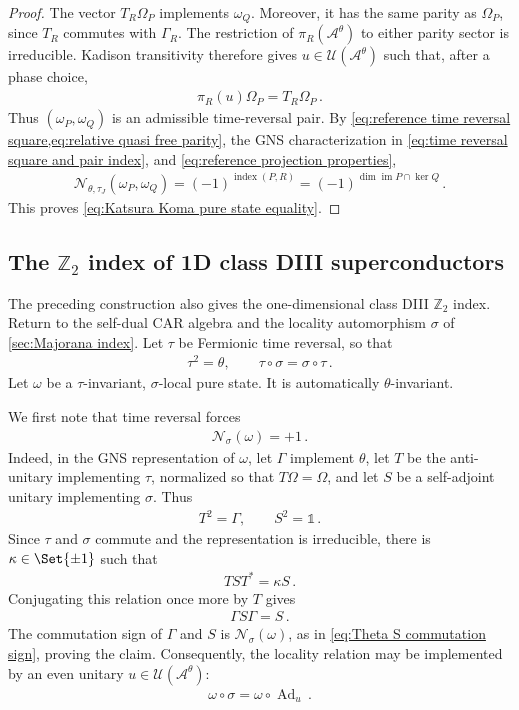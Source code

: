 \documentclass[a4paper,10pt]{article}
\numberwithin{equation}{section}
\theoremstyle{plain}
\theoremstyle{plain}
\theoremstyle{plain}
\theoremstyle{plain}
\theoremstyle{plain}
\theoremstyle{remark}
\theoremstyle{definition}
\newcommand{\ZZ}{\mathbb{Z}}
\newcommand{\calA}{\mathcal{A}}
\newcommand{\calN}{\mathcal{N}}
\newcommand{\calU}{\mathcal{U}}
\newcommand{\Ad}[1]{\operatorname{Ad}_{#1}}
\newcommand{\Id}{\mathds{1}}
\newcommand{\im}{\operatorname{im}}
\newcommand{\eq}[1]{\begin{align*}#1\end{align*}}
\newcommand{\br}[1]{\left(#1\right)}
\begin{document}
\begin{proof}
The vector $T_R\Omega_P$ implements $\omega_Q$. Moreover, it has the
same parity as $\Omega_P$, since $T_R$ commutes with $\Gamma_R$. The
restriction of $\pi_R(\calA^\theta)$ to either parity sector is
irreducible. Kadison transitivity therefore gives
$u\in\calU(\calA^\theta)$ such that, after a phase choice,
\eq{
    \pi_R(u)\Omega_P=T_R\Omega_P\,.
}
Thus $(\omega_P,\omega_Q)$ is an admissible time-reversal pair. By
\cref{eq:reference time reversal square,eq:relative quasi free parity},
the GNS characterization in
\cref{eq:time reversal square and pair index}, and
\cref{eq:reference projection properties},
\eq{
    \calN_{\theta,\tau_J}(\omega_P,\omega_Q)
    =
    \br{-1}^{\operatorname{index}(P,R)}
    =
    \br{-1}^{\dim\im P\cap\ker Q}\,.
}
This proves \cref{eq:Katsura Koma pure state equality}.
\end{proof}

\subsection{The $\ZZ_2$ index of 1D class DIII superconductors}
\label{sec:DIII index}

The preceding construction also gives the one-dimensional class DIII
$\ZZ_2$ index. Return to the self-dual CAR algebra and the locality
automorphism $\sigma$ of \cref{sec:Majorana index}. Let $\tau$ be
Fermionic time reversal, so that
\eq{
    \tau^2
    =
    \theta,
    \qquad
    \tau\circ\sigma
    =
    \sigma\circ\tau\,.
}
Let $\omega$ be a $\tau$-invariant, $\sigma$-local pure state. It is
automatically $\theta$-invariant.

We first note that time reversal forces
\eq{
    \calN_\sigma(\omega)
    =
    +1\,.
}
Indeed, in the GNS representation of $\omega$, let $\Gamma$ implement
$\theta$, let $T$ be the anti-unitary implementing $\tau$, normalized
so that $T\Omega=\Omega$, and let $S$ be a self-adjoint unitary
implementing $\sigma$. Thus
\eq{
    T^2
    =
    \Gamma,
    \qquad
    S^2
    =
    \Id\,.
}
Since $\tau$ and $\sigma$ commute and the representation is
irreducible, there is $\kappa\in\Set{\pm1}$ such that
\eq{
    TST^*
    =
    \kappa S\,.
}
Conjugating this relation once more by $T$ gives
\eq{
    \Gamma S\Gamma
    =
    S\,.
}
The commutation sign of $\Gamma$ and $S$ is
$\calN_\sigma(\omega)$, as in
\cref{eq:Theta S commutation sign}, proving the claim. Consequently,
the locality relation may be implemented by an even unitary
$u\in\calU(\calA^\theta)$:
\eq{
    \omega\circ\sigma
    =
    \omega\circ\Ad{u}\,.
}
\end{document}
